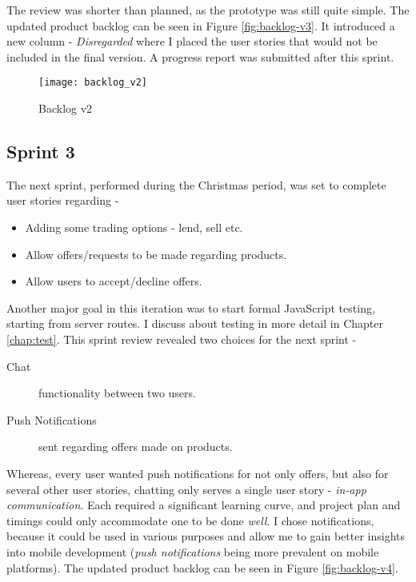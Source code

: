 The review was shorter than planned, as the prototype was still quite simple. The updated product backlog can be seen in Figure \ref{fig:backlog-v3}. It introduced a new column - \textit{Disregarded} where I placed the user stories that would not be included in the final version. A progress report was submitted after this sprint.

\begin{figure}[!h]
    \centering
    \texttt{[image: backlog\_v2]}
    \caption{Backlog v2}\label{fig:backlog-v2}
\end{figure}

\subsection{Sprint 3}

The next sprint, performed during the Christmas period, was set to complete user stories regarding - 

\begin{itemize}
	\item Adding some trading options - lend, sell etc.
	\item Allow offers/requests to be made regarding products.
	\item Allow users to accept/decline offers.
\end{itemize}

Another major goal in this iteration was to start formal JavaScript testing, starting from server routes. I discuss about testing in more detail in Chapter \ref{chap:test}. This sprint review revealed two choices for the next sprint - 

\begin{description}
	\item [Chat] functionality between two users.
	\item [Push Notifications] sent regarding offers made on products.
\end{description}

Whereas, every user wanted push notifications for not only offers, but also for several other user stories, chatting only serves a single user story - \textit{in-app communication}. Each required a significant learning curve, and project plan and timings could only accommodate one to be done \textit{well}. I chose notifications, because it could be used in various purposes and allow me to gain better insights into mobile development (\textit{push notifications} being more prevalent on mobile platforms). The updated product backlog can be seen in Figure \ref{fig:backlog-v4}.

